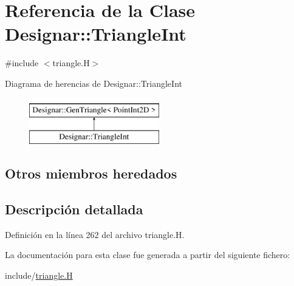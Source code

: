 \hypertarget{class_designar_1_1_triangle_int}{}\section{Referencia de la Clase Designar\+:\+:Triangle\+Int}
\label{class_designar_1_1_triangle_int}


{\ttfamily \#include $<$triangle.\+H$>$}

Diagrama de herencias de Designar\+:\+:Triangle\+Int\begin{figure}[H]
\begin{center}
\leavevmode
\includegraphics[height=2.000000cm]{class_designar_1_1_triangle_int}
\end{center}
\end{figure}
\subsection*{Otros miembros heredados}


\subsection{Descripción detallada}


Definición en la línea 262 del archivo triangle.\+H.



La documentación para esta clase fue generada a partir del siguiente fichero\+:\begin{DoxyCompactItemize}
\item 
include/\hyperlink{triangle_8_h}{triangle.\+H}\end{DoxyCompactItemize}
